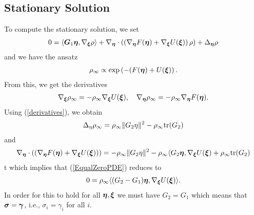 \documentclass[11pt,twoside,a4paper]{article}
\begin{document}
\subsection{Stationary Solution}
To compute the stationary solution, we set 
\begin{align} \label{EqualZeroPDE}
    0 = \langle \bm{G}_1{\bm{\eta}}, \nabla_{{\bm{\xi}}} \rho\rangle + \nabla_{{\bm{\eta}}} \cdot \left( \left( \nabla _{{\bm{\eta}}}F({\bm{\eta}})  + \nabla_{{\bm{\xi}}} U({\bm{\xi}})
    \right) \rho\right) + \Delta_{{\bm{\eta}}} \rho
\end{align}
and we have the ansatz 
\begin{align}
    \rho_{\infty} \propto \exp\left(-(F({\bm{\eta}})+U({\bm{\xi}})\right).
\end{align}
From this, we get the derivatives 
\begin{align} \label{derivatives}
    \nabla_{{\bm{\xi}}} \rho_{\infty} = -\rho_{\infty} \nabla_{{\bm{\xi}}}U({\bm{\xi}}) ,
    \quad \nabla_{{\bm{\eta}}} \rho_{\infty} = -\rho_{\infty} \nabla_{{\bm{\eta}}} F({\bm{\eta}}).
\end{align}
Using (\ref{derivatives}), we obtain 
\begin{align}
    \Delta_{\eta}\rho_{\infty} = \rho_{\infty} \lVert G_2 \eta \rVert^2 - \rho_{\infty} {\rm{tr}}(G_2) 
\end{align}
and 
\begin{align}
      \nabla_{{\bm{\eta}}} \cdot \left( \left( \nabla _{{\bm{\eta}}}F({\bm{\eta}})  + \nabla_{{\bm{\xi}}} U({\bm{\xi}})
    \right)\right)= -\rho_{\infty} \lVert G_2 \eta \rVert^2 - \rho_{\infty} \langle G_2{\bm{\eta}} , \nabla_{{\bm{\xi}}}U({\bm{\xi}}) + \rho_{\infty} {\rm{tr}}(G_2)
\end{align}t
which implies that (\ref{EqualZeroPDE}) reduces to 
\begin{align}
    0 = \rho_{\infty} \langle (G_2-G_1){\bm{\eta}}, \nabla_{{\bm{\xi}}} U({\bm{\xi}}) \rangle.
\end{align}
In order for this to hold for all ${\bm{\eta}},{\bm{\xi}}$ we must have $G_2=G_1$ which means that ${\bm{\sigma}}={\bm{\gamma}}$, i.e., $\sigma_i=\gamma_i$ for all $i$.
\end{document}
